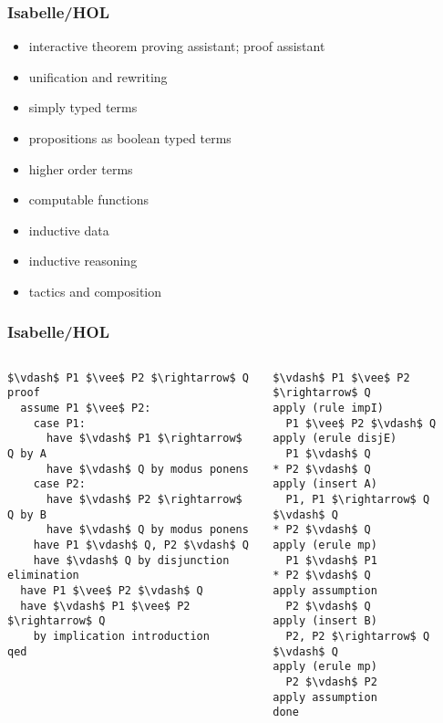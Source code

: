 \documentclass{beamer}
\begin{document}
\begin{frame}
\frametitle{Isabelle/HOL}
\begin{itemize}
\item interactive theorem proving assistant; proof assistant
\item unification and rewriting
\item simply typed terms
\item propositions as boolean typed terms
\item higher order terms
\item computable functions
\item inductive data
\item inductive reasoning
\item tactics and composition
\end{itemize}
\end{frame}



\begin{frame}[fragile]
	\frametitle{Isabelle/HOL}
\begin{columns}
\begin{column}{0.5\textwidth}
\begin{lstlisting}[language=logic, mathescape]
$\vdash$ P1 $\vee$ P2 $\rightarrow$ Q
proof
  assume P1 $\vee$ P2:
    case P1:
      have $\vdash$ P1 $\rightarrow$ Q by A
      have $\vdash$ Q by modus ponens
    case P2:
      have $\vdash$ P2 $\rightarrow$ Q by B    
      have $\vdash$ Q by modus ponens
    have P1 $\vdash$ Q, P2 $\vdash$ Q
    have $\vdash$ Q by disjunction elimination
  have P1 $\vee$ P2 $\vdash$ Q
  have $\vdash$ P1 $\vee$ P2 $\rightarrow$ Q
    by implication introduction  
qed
\end{lstlisting}
\end{column}

\begin{column}{0.5\textwidth}
\begin{lstlisting}[language=logic, mathescape]
$\vdash$ P1 $\vee$ P2 $\rightarrow$ Q
apply (rule impI)
  P1 $\vee$ P2 $\vdash$ Q
apply (erule disjE)
  P1 $\vdash$ Q
* P2 $\vdash$ Q
apply (insert A)
  P1, P1 $\rightarrow$ Q $\vdash$ Q
* P2 $\vdash$ Q
apply (erule mp)
  P1 $\vdash$ P1
* P2 $\vdash$ Q
apply assumption 
  P2 $\vdash$ Q
apply (insert B)
  P2, P2 $\rightarrow$ Q $\vdash$ Q
apply (erule mp)
  P2 $\vdash$ P2
apply assumption 
done
\end{lstlisting}
\end{column}
\end{columns}
\end{frame}
\end{document}
